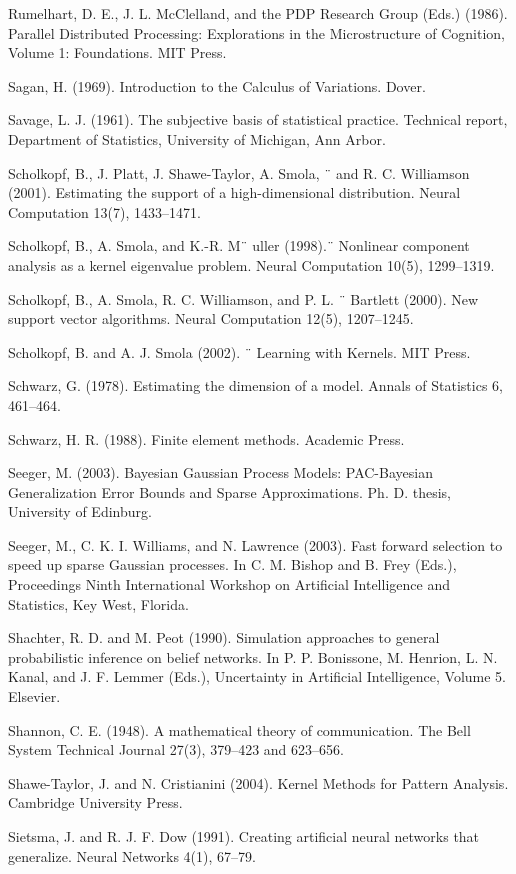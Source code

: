 \documentclass[
  10
]{article}
\begin{document}
Rumelhart, D. E., J. L. McClelland, and the PDP Research Group (Eds.)
(1986). Parallel Distributed Processing: Explorations in the
Microstructure of Cognition, Volume 1: Foundations. MIT Press.

Sagan, H. (1969). Introduction to the Calculus of Variations. Dover.

Savage, L. J. (1961). The subjective basis of statistical practice.
Technical report, Department of Statistics, University of Michigan, Ann
Arbor.

Scholkopf, B., J. Platt, J. Shawe-Taylor, A. Smola, ¨ and R. C.
Williamson (2001). Estimating the support of a high-dimensional
distribution. Neural Computation 13(7), 1433--1471.

Scholkopf, B., A. Smola, and K.-R. M¨ uller (1998).¨ Nonlinear component
analysis as a kernel eigenvalue problem. Neural Computation 10(5),
1299--1319.

Scholkopf, B., A. Smola, R. C. Williamson, and P. L. ¨ Bartlett (2000).
New support vector algorithms. Neural Computation 12(5), 1207--1245.

Scholkopf, B. and A. J. Smola (2002). ¨ Learning with Kernels. MIT
Press.

Schwarz, G. (1978). Estimating the dimension of a model. Annals of
Statistics 6, 461--464.

Schwarz, H. R. (1988). Finite element methods. Academic Press.

Seeger, M. (2003). Bayesian Gaussian Process Models: PAC-Bayesian
Generalization Error Bounds and Sparse Approximations. Ph. D. thesis,
University of Edinburg.

Seeger, M., C. K. I. Williams, and N. Lawrence (2003). Fast forward
selection to speed up sparse Gaussian processes. In C. M. Bishop and B.
Frey (Eds.), Proceedings Ninth International Workshop on Artificial
Intelligence and Statistics, Key West, Florida.

Shachter, R. D. and M. Peot (1990). Simulation approaches to general
probabilistic inference on belief networks. In P. P. Bonissone, M.
Henrion, L. N. Kanal, and J. F. Lemmer (Eds.), Uncertainty in Artificial
Intelligence, Volume 5. Elsevier.

Shannon, C. E. (1948). A mathematical theory of communication. The Bell
System Technical Journal 27(3), 379--423 and 623--656.

Shawe-Taylor, J. and N. Cristianini (2004). Kernel Methods for Pattern
Analysis. Cambridge University Press.

Sietsma, J. and R. J. F. Dow (1991). Creating artificial neural networks
that generalize. Neural Networks 4(1), 67--79.
\end{document}
